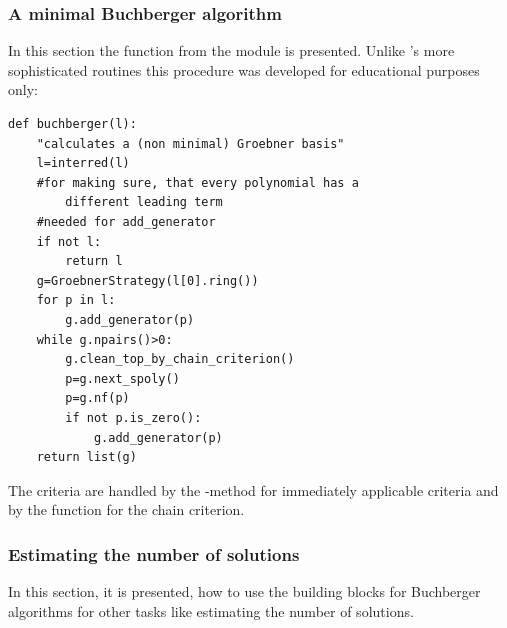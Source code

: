 \subsubsection{A minimal Buchberger algorithm}
In this section   the  function from the module
 is presented. Unlike \PolyBoRi's more sophisticated
routines this procedure was developed for educational purposes only:
\begin{lstlisting}
def buchberger(l):
    "calculates a (non minimal) Groebner basis"
    l=interred(l)
    #for making sure, that every polynomial has a 
        different leading term
    #needed for add_generator
    if not l:
        return l
    g=GroebnerStrategy(l[0].ring())
    for p in l:
        g.add_generator(p)
    while g.npairs()>0:
        g.clean_top_by_chain_criterion()
        p=g.next_spoly()
        p=g.nf(p)
        if not p.is_zero():
            g.add_generator(p)
    return list(g)
\end{lstlisting}
The criteria are handled by the -method for
immediately applicable criteria and by the function  for the chain criterion.


\subsubsection{Estimating the number of solutions}
In this section, it is presented, how to use the building blocks for Buchberger algorithms for other tasks like estimating the number of solutions.

